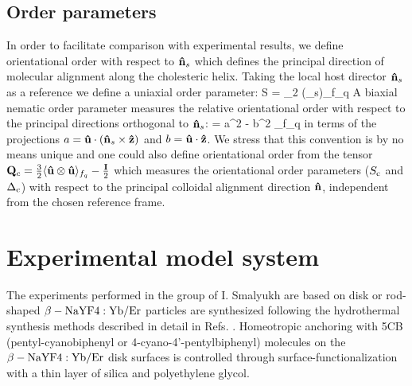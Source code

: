\subsection{Order parameters}

In order to facilitate comparison with experimental results, we define orientational order  with respect to  ${\bf \hat{n}}_{s}$ which defines the principal direction of molecular alignment along the cholesteric helix. Taking the local host director ${\bf \hat{n}}_{s}$ as a reference we define a uniaxial order parameter:
\beq
S = _{2} (\bhu \cdot \bn_{s})\rangle_{f_{q}}
\label{s2}
\eeq
A biaxial nematic order parameter measures the relative orientational order with respect to the principal directions orthogonal to ${\bf \hat{n}}_{s}$:
\beq
\Delta = \langle a^{2} - b^{2} \rangle_{f_{q}}
\label{d2}
\eeq
in terms of the projections $a= {\bf \hat{u}} \cdot ({\bf \hat{n}}_{s} \times {\bf \hat{z}})$ and $b = {\bf \hat{u}} \cdot {\bf \hat{z}}$. We stress that this convention is by no means unique and one could also define orientational order from the tensor ${\bf Q}_{c} =  \frac{3}{2} \langle {\bf \hat{u}} \otimes {\bf \hat{u}}  \rangle_{f_{q}} - \frac{{\bf I}}{2} $ which measures the orientational order parameters ($S_{\rm c}$ and $\Delta_{\rm c}$) with respect to the principal colloidal alignment direction ${\bf \hat{n}}$, independent from the chosen reference frame.


\section[Model system]{Experimental model system}


The experiments performed in the group of I. Smalyukh are based on disk or rod-shaped $\beta- {\rm NaYF4:Yb/Er}$ particles are synthesized following the hydrothermal synthesis methods described in detail in Refs. \cite{mundoor2018,mundoor2021}. Homeotropic anchoring with 5CB (pentyl-cyanobiphenyl or 4-cyano-4'-pentylbiphenyl) molecules
on the $\beta-{\rm NaYF4:Yb/Er}$ disk surfaces is controlled
through surface-functionalization with a thin layer of
silica and polyethylene glycol.

